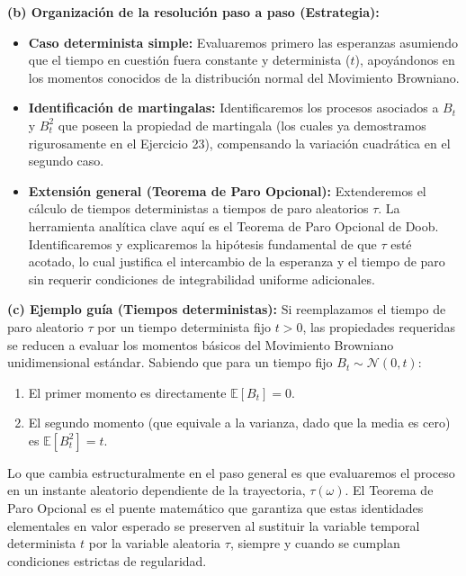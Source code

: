\documentclass[11pt, letterpaper]{article}
\begin{document}
\begin{solucion}
    \textbf{(b) Organización de la resolución paso a paso (Estrategia):}
    \begin{itemize}
        \item[(i)] \textbf{Caso determinista simple:} Evaluaremos primero las esperanzas asumiendo que el tiempo en cuestión fuera constante y determinista ($t$), apoyándonos en los momentos conocidos de la distribución normal del Movimiento Browniano.
        \item[(ii)] \textbf{Identificación de martingalas:} Identificaremos los procesos asociados a $B_t$ y $B_t^2$ que poseen la propiedad de martingala (los cuales ya demostramos rigurosamente en el Ejercicio 23), compensando la variación cuadrática en el segundo caso.
        \item[(iii)] \textbf{Extensión general (Teorema de Paro Opcional):} Extenderemos el cálculo de tiempos deterministas a tiempos de paro aleatorios $\tau$. La herramienta analítica clave aquí es el Teorema de Paro Opcional de Doob. Identificaremos y explicaremos la hipótesis fundamental de que $\tau$ esté acotado, lo cual justifica el intercambio de la esperanza y el tiempo de paro sin requerir condiciones de integrabilidad uniforme adicionales.
    \end{itemize}

    \vspace{3mm}
    \textbf{(c) Ejemplo guía (Tiempos deterministas):}
    Si reemplazamos el tiempo de paro aleatorio $\tau$ por un tiempo determinista fijo $t > 0$, las propiedades requeridas se reducen a evaluar los momentos básicos del Movimiento Browniano unidimensional estándar.
    Sabiendo que para un tiempo fijo $B_t \sim \mathcal{N}(0, t)$:
    \begin{enumerate}
        \item El primer momento es directamente $\mathbb{E}[B_t] = 0$.
        \item El segundo momento (que equivale a la varianza, dado que la media es cero) es $\mathbb{E}[B_t^2] = t$.
    \end{enumerate}
    Lo que cambia estructuralmente en el paso general es que evaluaremos el proceso en un instante aleatorio dependiente de la trayectoria, $\tau(\omega)$. El Teorema de Paro Opcional es el puente matemático que garantiza que estas identidades elementales en valor esperado se preserven al sustituir la variable temporal determinista $t$ por la variable aleatoria $\tau$, siempre y cuando se cumplan condiciones estrictas de regularidad.


\end{solucion}
\end{document}
